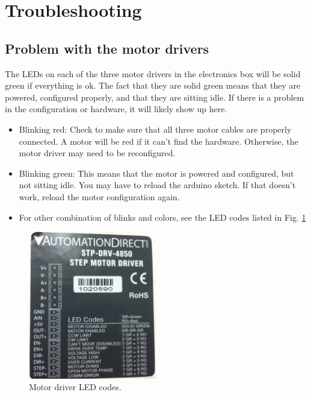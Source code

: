 \documentclass[11pt]{article}
\begin{document}
\section{Troubleshooting}

\subsection{Problem with the motor drivers}
The LEDs on each of the three motor drivers in the electronics box will be solid green if everything is ok.
The fact that they are solid green means that they are powered, configured properly, and that they are sitting idle.  
If there is a problem in the configuration or hardware, it will likely show up here.
\begin{itemize}
 	\item Blinking red:  Check to make sure that all three motor cables are properly connected.  
		A motor will be red if it can't find the hardware.  Otherwise, the motor driver may need to be reconfigured.
	\item Blinking green:  This means that the motor is powered and configured, but not sitting idle.  You may have to reload the arduino sketch.  If that doesn't work, reload the motor 		configuration again.
	\item For other combination of blinks and colors, see the LED codes listed in Fig. \ref{ledCodes}
\end{itemize}

\begin{figure}[h]
\begin{center}
\includegraphics[width = 2.2in]{photoLedCodes.JPG}
\caption{Motor driver LED codes.}  
\label{ledCodes}
\end{center}
\end{figure}
\end{document}
